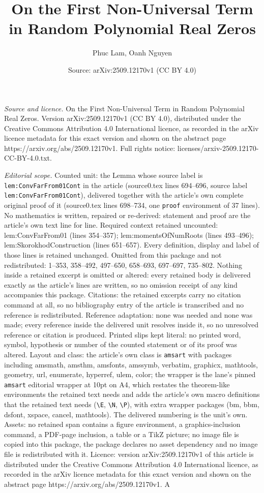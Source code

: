 \documentclass[10pt,a4paper]{amsart}
\title[On the First Non-Universal Term in Random Polynomial Real Ze]{On the First Non-Universal Term in Random Polynomial Real Zeros}
\author{Phuc Lam, Oanh Nguyen}
\date{Source: arXiv:2509.12170v1 (CC BY 4.0)}
\begin{document}
\maketitle

\noindent\emph{Source and licence.} On the First Non-Universal Term in Random Polynomial Real Zeros. Version arXiv:2509.12170v1 (CC BY 4.0), distributed under the Creative Commons Attribution 4.0 International licence, as recorded in the arXiv licence metadata for this exact version and shown on the abstract page https://arxiv.org/abs/2509.12170v1. Full rights notice: licenses/arxiv-2509.12170-CC-BY-4.0.txt.\par\smallskip

\noindent\textit{Editorial scope.} Counted unit: the Lemma whose source label is \texttt{lem:ConvFarFrom01Cont} in the article (source0.tex lines 694--696, source label \texttt{lem:ConvFarFrom01Cont}), delivered together with the article's own complete original proof of it (source0.tex lines 698--734, one \texttt{proof} environment of 37 lines). No mathematics is written, repaired or re-derived: statement and proof are the article's own text line for line. Required context retained uncounted: lem:ConvFarFrom01 (lines 354--357); lem:momentsOfNumRoots (lines 493--496); lem:SkorokhodConstruction (lines 651--657). Every definition, display and label of those lines is retained unchanged. Omitted from this package and not redistributed: 1--353, 358--492, 497--650, 658--693, 697--697, 735--802. Nothing inside a retained excerpt is omitted or altered: every retained body is delivered exactly as the article's lines are written, so no omission receipt of any kind accompanies this package. Citations: the retained excerpts carry no citation command at all, so no bibliography entry of the article is transcribed and no reference is redistributed. Reference adaptation: none was needed and none was made; every reference inside the delivered unit resolves inside it, so no unresolved reference or citation is produced. Printed slips kept literal: no printed word, symbol, hypothesis or number of the counted statement or of its proof was altered. Layout and class: the article's own class is \texttt{amsart} with packages including amsmath, amsthm, amsfonts, amssymb, verbatim, graphicx, mathtools, geometry, url, enumerate, hyperref, ulem, color; the wrapper is the lane's pinned \texttt{amsart} editorial wrapper at 10pt on A4, which restates the theorem-like environments the retained text needs and adds the article's own macro definitions that the retained text needs (\texttt{\textbackslash E}, \texttt{\textbackslash N}, \texttt{\textbackslash P}), with extra wrapper packages (bm, bbm, dsfont, xspace, cancel, mathtools). The delivered numbering is the unit's own. Assets: no retained span contains a figure environment, a graphics-inclusion command, a PDF-page inclusion, a table or a TikZ picture; no image file is copied into this package, the package declares no asset dependency and no image file is redistributed with it. Licence: version arXiv:2509.12170v1 of this article is distributed under the Creative Commons Attribution 4.0 International licence, as recorded in the arXiv licence metadata for this exact version and shown on the abstract page https://arxiv.org/abs/2509.12170v1. A 
\end{document}
